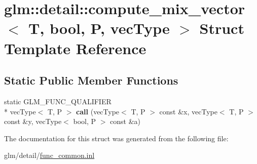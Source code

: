 \hypertarget{structglm_1_1detail_1_1compute__mix__vector_3_01T_00_01bool_00_01P_00_01vecType_01_4}{\section{glm\-:\-:detail\-:\-:compute\-\_\-mix\-\_\-vector$<$ T, bool, P, vec\-Type $>$ Struct Template Reference}
\label{structglm_1_1detail_1_1compute__mix__vector_3_01T_00_01bool_00_01P_00_01vecType_01_4}
}
\subsection*{Static Public Member Functions}
\begin{DoxyCompactItemize}
\item 
\hypertarget{structglm_1_1detail_1_1compute__mix__vector_3_01T_00_01bool_00_01P_00_01vecType_01_4_a8c1f32466902b61e306585f11d903212}{static G\-L\-M\-\_\-\-F\-U\-N\-C\-\_\-\-Q\-U\-A\-L\-I\-F\-I\-E\-R \\*
vec\-Type$<$ T, P $>$ {\bfseries call} (vec\-Type$<$ T, P $>$ const \&x, vec\-Type$<$ T, P $>$ const \&y, vec\-Type$<$ bool, P $>$ const \&a)}\label{structglm_1_1detail_1_1compute__mix__vector_3_01T_00_01bool_00_01P_00_01vecType_01_4_a8c1f32466902b61e306585f11d903212}

\end{DoxyCompactItemize}


The documentation for this struct was generated from the following file\-:\begin{DoxyCompactItemize}
\item 
glm/detail/\hyperlink{func__common_8inl}{func\-\_\-common.\-inl}\end{DoxyCompactItemize}
